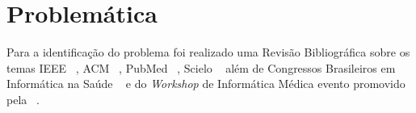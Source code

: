 







\section{Problemática}\label{section:problematica}
Para a identificação do problema foi realizado uma Revisão Bibliográfica sobre os temas IEEE ~\cite{ieee}, ACM ~\cite{acm}, PubMed ~\cite{pubmed}, Scielo ~\cite{scielo} além de Congressos Brasileiros em Informática na Saúde ~\cite{cbis} e do \textit{Workshop} de Informática Médica evento promovido pela ~\cite{sbc}.

